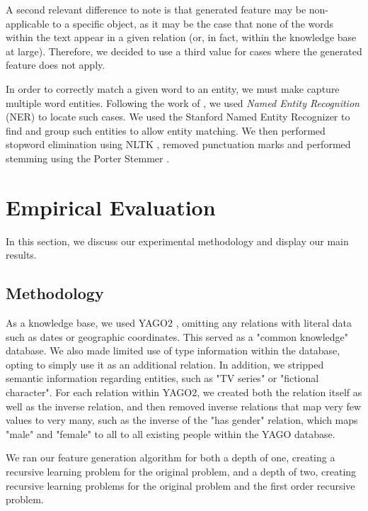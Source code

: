 \documentclass[twoside,11pt]{article}
\theoremstyle{definition}
\begin{document}
A second relevant difference to note is that generated feature may be non-applicable to a specific object, as it may be the case that none of the words within the text appear in a given relation (or, in fact, within the knowledge base at large). Therefore, we decided to use a third value for cases where the generated feature does not apply.

In order to correctly match a given word to an entity, we must make capture multiple word entities. Following the work of , we used \emph{Named Entity Recognition} (NER) to locate such cases. We used the Stanford Named Entity Recognizer \cite{finkel2005incorporating} to find and group such entities to allow entity matching. We then performed stopword elimination using NLTK \cite{bird2009natural} , removed punctuation marks and performed stemming using the Porter Stemmer \cite{van1980new}.


\section{Empirical Evaluation}
In this section, we discuss our experimental methodology and display our main results.
\subsection{Methodology}

As a knowledge base, we used YAGO2 \cite{hoffart2013yago2}, omitting any relations with literal data such as dates or geographic coordinates. This served as a "common knowledge" database. We also made limited use of type information within the database, opting to simply use it as an additional relation.
In addition, we stripped semantic information regarding entities, such as "TV series" or "fictional character". For each relation within YAGO2, we created both the relation itself as well as the inverse relation, and then removed inverse relations that map very few values to very many, such as the inverse of the "has gender" relation, which maps "male" and "female" to all to all existing people within the YAGO database.

We ran our feature generation algorithm for both a depth of one, creating a recursive learning problem for the original problem, and a depth of two, creating recursive learning problems for the original problem and the first order recursive problem.
\end{document}
